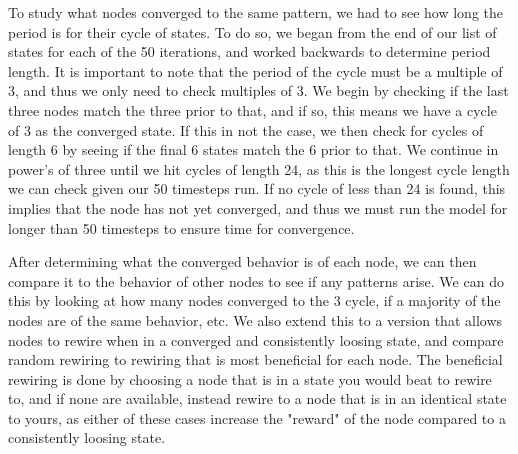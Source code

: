 \documentclass[letterpaper, 12 pt, conference]{ieeeconf}
\begin{document}
\par
To study what nodes converged to the same pattern, we had to see how long the period is for their cycle of states. To do so, we began from the end of our list of states for each of the 50 iterations, and worked backwards to determine period length. It is important to note that the period of the cycle must be a multiple of 3, and thus we only need to check multiples of 3. We begin by checking if the last three nodes match the three prior to that, and if so, this means we have a cycle of 3 as the converged state. If this in not the case, we then check for cycles of length 6 by seeing if the final 6 states match the 6 prior to that. We continue in power's of three until we hit cycles of length 24, as this is the longest cycle length we can check given our 50 timesteps run. If no cycle of less than 24 is found, this implies that the node has not yet converged, and thus we must run the model for longer than 50 timesteps to ensure time for convergence. 
\par
After determining what the converged behavior is of each node, we can then compare it to the behavior of other nodes to see if any patterns arise. We can do this by looking at how many nodes converged to the 3 cycle, if a majority of the nodes are of the same behavior, etc. We also extend this to a version that allows nodes to rewire when in a converged and consistently loosing state, and compare random rewiring to rewiring that is most beneficial for each node. The beneficial rewiring is done by choosing a node that is in a state you would beat to rewire to, and if none are available, instead rewire to a node that is in an identical state to yours, as either of these cases increase the "reward" of the node compared to a consistently loosing state. 
\end{document}
